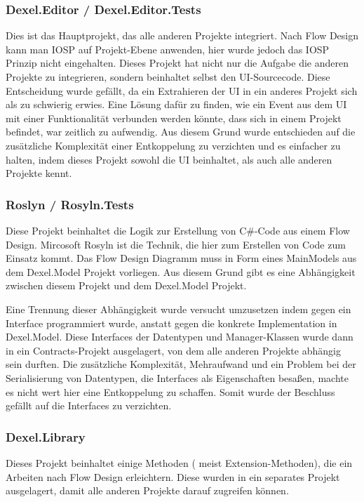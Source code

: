 \subsubsection{Dexel.Editor / Dexel.Editor.Tests}

Dies ist das Hauptprojekt, das alle anderen Projekte integriert.
Nach Flow Design kann man IOSP auf Projekt-Ebene anwenden, hier wurde jedoch das IOSP
Prinzip nicht eingehalten. Dieses Projekt hat nicht nur die Aufgabe die
anderen Projekte zu integrieren, sondern beinhaltet selbst den
UI-Sourcecode. Diese Entscheidung wurde gefällt, da ein Extrahieren der UI
in ein anderes Projekt sich als zu schwierig erwies. Eine Lösung dafür zu
finden, wie ein Event aus dem UI mit einer Funktionalität verbunden werden
könnte, dass sich in einem Projekt befindet, war zeitlich zu
aufwendig. Aus diesem Grund wurde entschieden auf die zusätzliche
Komplexität einer Entkoppelung zu verzichten und es einfacher zu halten, indem
dieses Projekt sowohl die UI beinhaltet, als auch alle anderen Projekte
kennt.

\subsubsection{Roslyn / Rosyln.Tests}

Diese Projekt beinhaltet die Logik zur Erstellung von C\#-Code aus einem Flow
Design. Mircosoft Rosyln ist die Technik, die hier zum Erstellen von Code zum
Einsatz kommt.
Das Flow Design Diagramm muss in Form eines MainModels aus dem
Dexel.Model Projekt vorliegen. Aus diesem Grund gibt es eine Abhängigkeit
zwischen diesem Projekt und dem Dexel.Model Projekt. 

Eine Trennung dieser Abhängigkeit wurde versucht umzusetzen indem gegen ein Interface
programmiert wurde, anstatt gegen die konkrete Implementation in
Dexel.Model. Diese Interfaces der Datentypen und Manager-Klassen wurde dann
in ein Contracts-Projekt ausgelagert, von dem alle anderen Projekte abhängig
sein durften. Die zusätzliche Komplexität, Mehraufwand und ein Problem bei
der Serialisierung von Datentypen, die Interfaces als Eigenschaften besaßen,
machte es nicht wert hier eine Entkoppelung zu schaffen. Somit wurde der
Beschluss gefällt auf die Interfaces zu verzichten.

\subsubsection{Dexel.Library}

Dieses Projekt beinhaltet einige Methoden ( meist Extension-Methoden), die ein Arbeiten
nach Flow Design erleichtern. Diese wurden in ein separates Projekt
ausgelagert, damit alle anderen Projekte darauf zugreifen können.

